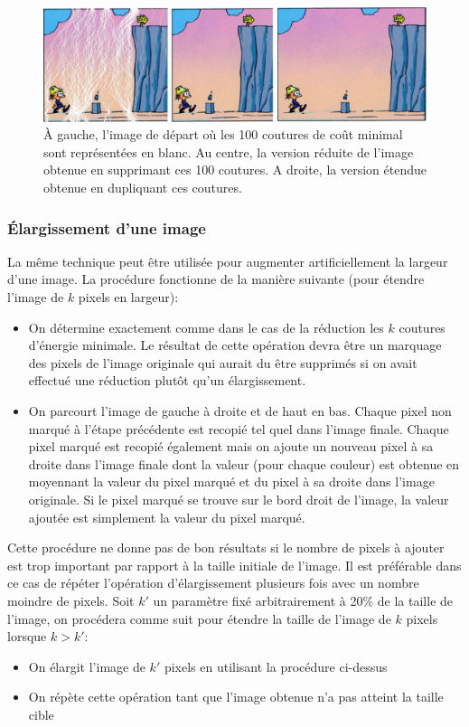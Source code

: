 \documentclass[a4paper,10pt]{article}
\begin{document}
\begin{figure}
\centerline{\includegraphics[width=14cm]{exemple-carving.pdf}}
\caption{\`A gauche, l'image de départ où les 100 coutures de coût
  minimal sont représentées en blanc. Au centre, la version réduite de
  l'image obtenue en supprimant ces 100 coutures. A droite, la version
  étendue obtenue en dupliquant ces
  coutures. \label{ref:exempleseamcarving}}
\end{figure}

\subsubsection{\'Elargissement d'une image}\label{sec:enlarge}

La même technique peut être utilisée pour augmenter artificiellement
la largeur d'une image. La procédure fonctionne de la manière suivante
(pour étendre l'image de $k$ pixels en largeur):
\begin{itemize}
\item On détermine exactement comme dans le cas de la réduction les
  $k$ coutures d'énergie minimale. Le résultat de cette opération
  devra être un marquage des pixels de l'image originale qui aurait du
  être supprimés si on avait effectué une réduction plutôt qu'un
  élargissement.
\item On parcourt l'image de gauche à droite et de haut en bas. Chaque
  pixel non marqué à l'étape précédente est recopié tel quel dans
  l'image finale. Chaque pixel marqué est recopié également mais on
  ajoute un nouveau pixel à sa droite dans l'image finale dont la
  valeur (pour chaque couleur) est obtenue en moyennant la valeur du
  pixel marqué et du pixel à sa droite dans l'image originale. Si le
  pixel marqué se trouve sur le bord droit de l'image, la valeur
  ajoutée est simplement la valeur du pixel marqué.
\end{itemize}

Cette procédure ne donne pas de bon résultats si le nombre de pixels à
ajouter est trop important par rapport à la taille initiale de
l'image. Il est préférable dans ce cas de répéter l'opération
d'élargissement plusieurs fois avec un nombre moindre de pixels. Soit
$k'$ un paramètre fixé arbitrairement à 20\% de la taille de l'image,
on procédera comme suit pour étendre la taille de l'image de $k$
pixels lorsque $k>k'$:
\begin{itemize}
\item On élargit l'image de $k'$ pixels en utilisant la procédure
  ci-dessus
\item On répète cette opération tant que l'image obtenue n'a pas
  atteint la taille cible
\end{itemize}
\end{document}
